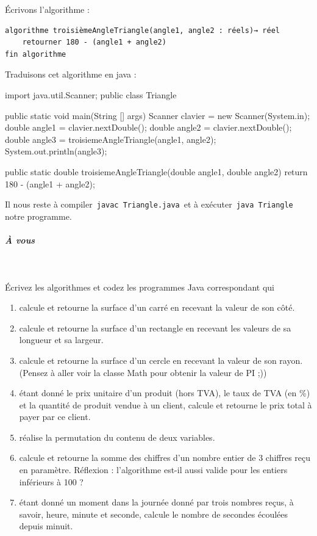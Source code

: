 \documentclass[11pt,a4paper]{article}
\begin{document}
          \'Ecrivons l'algorithme :
          \begin{verbatim}
algorithme troisièmeAngleTriangle(angle1, angle2 : réels)→ réel
    retourner 180 - (angle1 + angle2)
fin algorithme
          \end{verbatim}
          Traduisons cet algorithme en java :
          \begin{Java}
import java.util.Scanner;
public class Triangle{
    public static void main(String [] args) {
        Scanner clavier = new Scanner(System.in);
        double angle1 = clavier.nextDouble();
        double angle2 = clavier.nextDouble();
        double angle3 = troisiemeAngleTriangle(angle1, angle2);
        System.out.println(angle3);
    }    
    
    public static double troisiemeAngleTriangle(double angle1, double angle2) {
        return 180 - (angle1 + angle2);
    }
}
        \end{Java}
        Il nous reste \`a compiler \,\verb|javac Triangle.java|\, et \`a ex\'ecuter \,\verb|java Triangle|\, notre programme.
        
            \par
        
			
		\subparagraph{\`A vous} 
		
					\textcolor{white}{.} \par
				
        \'Ecrivez les algorithmes et codez les programmes Java correspondant qui 
          
					\begin{enumerate}
				
			\item calcule et retourne la surface d'un carr\'e en recevant la valeur de son c\^ot\'e.
			\item calcule et retourne la surface d'un rectangle en recevant les valeurs de sa longueur et sa largeur.
			\item calcule et retourne la surface d'un cercle en recevant la valeur de son rayon.  (Pensez \`a aller voir la classe Math pour obtenir la valeur de PI ;))
			\item \'etant donn\'e le prix unitaire d'un produit (hors TVA), le taux de TVA (en \%) 
            et la quantit\'e de produit vendue \`a un client, calcule et retourne le prix total \`a payer par ce client.
			\item r\'ealise la permutation du contenu de deux variables.
			\item calcule et retourne la somme des chiffres d'un nombre entier de 3 chiffres re\c cu en param\`etre. R\'eflexion  : l'algorithme est-il aussi valide pour les entiers inf\'erieurs \`a 100 ?
			\item \'etant donn\'e un moment dans la journ\'ee donn\'e par trois nombres re\c cus, \`a savoir, heure, minute et seconde, calcule le nombre de secondes \'ecoul\'ees depuis minuit.
					\end{enumerate}
				
            \par
        
				
\end{document}
